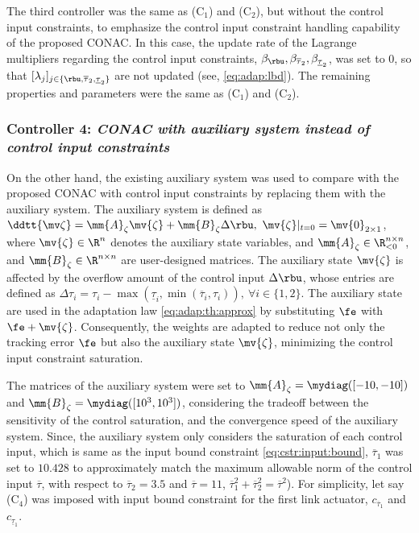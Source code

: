 \documentclass[lettersize,journal]{IEEEtran}
\begin{document}
The third controller was the same as (C$_1$) and (C$_2$), but without the control input constraints, to emphasize the control input constraint handling capability of the proposed CONAC.
In this case, the update rate of the Lagrange multipliers regarding the control input constraints, \ie $\beta_{\rbu},\beta_{\overline{\tau}_2},\beta_{\underline{\tau}_2}$, was set to $0$, so that $[\lambda_j]_{j\in\{\rbu,\overline{\tau}_2,\underline{\tau}_2\}}$ are not updated (see, \eqref{eq:adap:lbd}).
The remaining properties and parameters were the same as (C$_1$) and (C$_2$).

\subsubsection*{Controller 4:  \textit{CONAC with auxiliary system instead of control input constraints}}

On the other hand, the existing auxiliary system \cite{Esfandiari:2014aa,Karason:1994aa,Esfandiari:2015aa} was used to compare with the proposed CONAC with control input constraints by replacing them with the auxiliary system.
The auxiliary system is defined as $\ddtt{\mv\zeta} = \mm{A}_\zeta \mv{\zeta} + \mm{B}_\zeta \Delta\rbu,\ \mv{\zeta}\vert_{t=0} = \mv{0}_{2\times1}$, where $\mv{\zeta}\in\R^n$ denotes the auxiliary state variables, and $\mm{A}_\zeta\in\R_{<0}^{n\times n}$, and $\mm{B}_\zeta\in\R^{n\times n}$ are user-designed matrices.
The auxiliary state $\mv{\zeta}$ is affected by the overflow amount of the control input $\Delta\rbu$, whose entries are defined as $\Delta\tau_{i} = 
\tau_{i}-\max(\underline\tau_i,\min(\overline\tau_i,\tau_i)),\ \forall i\in\{1,2\}$.
The auxiliary state are used in the adaptation law \eqref{eq:adap:th:approx} by substituting $\fe$ with $\fe+\mv{\zeta}$.
Consequently, the weights are adapted to reduce not only the tracking error $\fe$ but also the auxiliary state $\mv{\zeta}$, minimizing the control input constraint saturation.

The matrices of the auxiliary system were set to $\mm{A}_\zeta=\mydiag([-10,-10])$ and $\mm{B}_\zeta=\mydiag([10^3,10^3])$, considering the tradeoff between the sensitivity of the control saturation, and the convergence speed of the auxiliary system.
Since, the auxiliary system only considers the saturation of each control input, \ie which is same as the input bound constraint \eqref{eq:cstr:input:bound}, $\overline{\tau}_1$ was set to $10.428$ to approximately match the maximum allowable norm of the control input $\overline\tau$, with respect to $\overline{\tau}_2=3.5$ and $\overline{\tau}=11$, \ie $\overline{\tau}_1^2+\overline{\tau}_2^2=\overline{\tau}^2$).
For simplicity, let say (C$_4$) was imposed with input bound constraint for the first link actuator, \ie $c_{\overline{\tau}_1}$ and $c_{\underline{\tau}_1}$.
\end{document}
